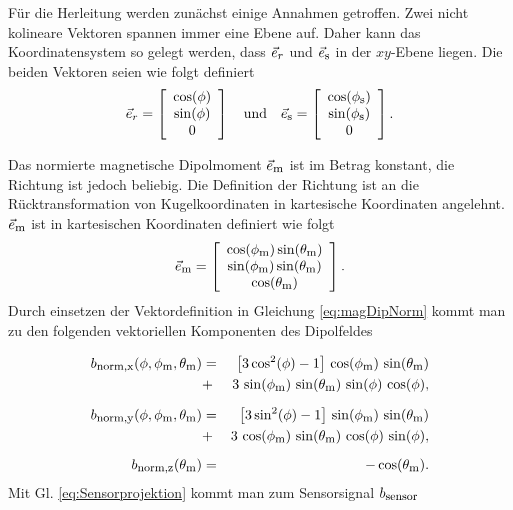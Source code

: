 Für die Herleitung werden zunächst einige Annahmen getroffen. Zwei nicht kolineare Vektoren spannen immer eine Ebene auf. Daher kann das Koordinatensystem so gelegt werden, dass $\vec{e}_{\textrm{\footnotesize{$r$}}}$ und $\vec{e}_{\textrm{\footnotesize{s}}}$ in der $xy$-Ebene liegen. Die beiden Vektoren seien wie folgt definiert
\begin{equation}
    \vec{e}_r = \left[\begin{array}{c} \cos(\phi)\\ \sin(\phi) \\ 0\end{array}\right] \quad \textrm{und} \quad
    \vec{e}_{\textrm{\footnotesize{s}}} = \left[\begin{array}{c} \cos(\phi_{\textrm{\footnotesize{s}}})\\ \sin(\phi_{\textrm{\footnotesize{s}}}) \\ 0\end{array}\right].
    \label{eq:defErEs}
\end{equation}

Das normierte magnetische Dipolmoment $\vec{e}_{\textrm{\footnotesize{m}}}$ ist im Betrag konstant, die Richtung ist jedoch beliebig. Die Definition der Richtung ist an die Rücktransformation von Kugelkoordinaten in kartesische Koordinaten angelehnt. $\vec{e}_{\textrm{\footnotesize{m}}}$ ist in kartesischen Koordinaten definiert wie folgt
\begin{equation}
    \vec{e}_{\textrm{\footnotesize{m}}} = \left[\begin{array}{c} \cos(\phi_{\textrm{\footnotesize{m}}})\sin(\theta_{\textrm{\footnotesize{m}}})\\ \sin(\phi_{\textrm{\footnotesize{m}}})\sin(\theta_{\textrm{\footnotesize{m}}}) \\ \cos(\theta_{\textrm{\footnotesize{m}}}) \end{array}\right].
    \label{eq:defEm}
 \end{equation}
Durch einsetzen der Vektordefinition in Gleichung \ref{eq:magDipNorm} kommt man zu den folgenden vektoriellen Komponenten des Dipolfeldes

 \begin{eqnarray}
    b_{\textrm{\footnotesize{norm,x}}}(\phi,\phi_{\textrm{\footnotesize{m}}},\theta_{\textrm{\footnotesize{m}}})&=&\big[3\cos^2(\phi)-1\big]\,\cos(\phi_{\textrm{\footnotesize{m}}})\,\sin(\theta_{\textrm{\footnotesize{m}}}) \nonumber \\ &+&  3 \,\sin(\phi_{\textrm{\footnotesize{m}}})\,\sin(\theta_{\textrm{\footnotesize{m}}})\,\sin(\phi)\,\cos(\phi),
    \label{eq:magNormX} \\[2mm]
    b_{\textrm{\footnotesize{norm,y}}}(\phi,\phi_{\textrm{\footnotesize{m}}},\theta_{\textrm{\footnotesize{m}}})&=&\big[3\sin^2(\phi)-1\big]\,\sin(\phi_{\textrm{\footnotesize{m}}})\,\sin(\theta_{\textrm{\footnotesize{m}}}) \nonumber\\ &+& 3 \,\cos(\phi_{\textrm{\footnotesize{m}}})\,\sin(\theta_{\textrm{\footnotesize{m}}})\,\cos(\phi)\,\sin(\phi),
    \label{eq:magNormY} \\[2mm]
    b_{\textrm{\footnotesize{norm,z}}}(\theta_{\textrm{\footnotesize{m}}}) &=& - \cos(\theta_{\textrm{\footnotesize{m}}}).
    \label{eq:magNormZ}
\end{eqnarray}
Mit Gl. \ref{eq:Sensorprojektion} kommt man zum Sensorsignal $b_{\textrm{\footnotesize{sensor}}}$

